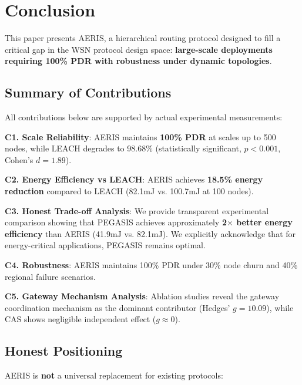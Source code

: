 
\section{Conclusion}
\label{sec:conclusion}

This paper presents AERIS, a hierarchical routing protocol designed to fill
a critical gap in the WSN protocol design space: \textbf{large-scale
deployments requiring 100\% PDR with robustness under dynamic topologies}.

\subsection{Summary of Contributions}

All contributions below are supported by actual experimental measurements:

\textbf{C1. Scale Reliability}: AERIS maintains \textbf{100\% PDR} at
scales up to 500 nodes, while LEACH degrades to 98.68\% (statistically
significant, $p < 0.001$, Cohen's $d = 1.89$).

\textbf{C2. Energy Efficiency vs LEACH}: AERIS achieves \textbf{18.5\%
energy reduction} compared to LEACH (82.1mJ vs. 100.7mJ at 100 nodes).

\textbf{C3. Honest Trade-off Analysis}: We provide transparent experimental
comparison showing that PEGASIS achieves approximately \textbf{2$\times$
better energy efficiency} than AERIS (41.9mJ vs. 82.1mJ). We explicitly
acknowledge that for energy-critical applications, PEGASIS remains optimal.

\textbf{C4. Robustness}: AERIS maintains 100\% PDR under 30\% node churn
and 40\% regional failure scenarios.

\textbf{C5. Gateway Mechanism Analysis}: Ablation studies reveal the
gateway coordination mechanism as the dominant contributor (Hedges'
$g = 10.09$), while CAS shows negligible independent effect ($g \approx 0$).

\subsection{Honest Positioning}

AERIS is \textbf{not} a universal replacement for existing protocols:

